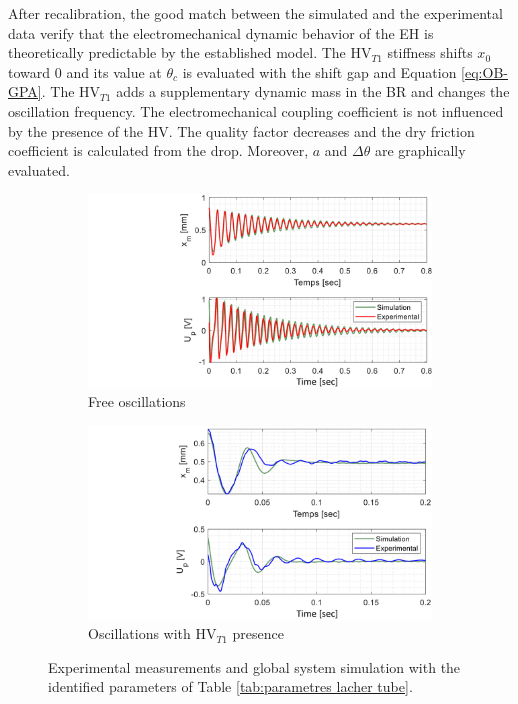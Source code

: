 \documentclass[3p,twocolumn,preprint]{elsarticle}
\begin{document}
After recalibration, the good match between the simulated and the experimental data verify that the electromechanical dynamic behavior of the EH is theoretically predictable by the established model. The HV$_{T1}$ stiffness shifts $x_0$ toward $0$ and its value at $\theta_c$ is evaluated with the shift gap and Equation \ref{eq:OB-GPA}. The HV$_{T1}$ adds a supplementary dynamic mass in the BR and changes the oscillation frequency. The electromechanical coupling coefficient is not influenced by the presence of the HV. The quality factor decreases and the dry friction coefficient is calculated from the drop. Moreover, $a$ and $\Delta\theta$ are graphically evaluated.
\begin{figure}[!htbp]	
\captionsetup{justification=centering}
	\begin{subfigure}{.49\linewidth}
		\includegraphics[trim={9cm 0cm 0cm 0cm},clip,width=\linewidth]{figures/recalage_free.pdf}
		\caption{Free oscillations}
		\label{fig:recalage_free}
	\end{subfigure}
	\begin{subfigure}{.49\linewidth}
		\includegraphics[trim={8.6cm 0cm 0cm 0cm},clip,width=\linewidth]{figures/recalage_tube.pdf}
		\caption{Oscillations with HV$_{T1}$ presence}
		\label{fig:recalage_tube}
	\end{subfigure}
	\caption{Experimental measurements and global system simulation with the identified parameters of Table \ref{tab:parametres lacher tube}.}
	\label{fig:recalage_global}
\end{figure}
\end{document}
